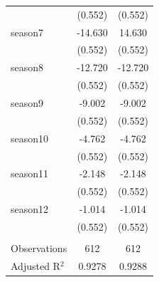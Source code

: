 \documentclass[12pt]{article}
\begin{document}
{\begin{table}[H]
{\begin{tabular}{@{\extracolsep{5pt}}lcc}
  & (0.552) & (0.552) \\ 
season7 & -14.630 & 14.630 \\ 
  & (0.552) & (0.552) \\ 
season8 & -12.720 & -12.720 \\ 
  & (0.552) & (0.552) \\ 
season9 & -9.002 & -9.002 \\ 
  & (0.552) & (0.552) \\ 
season10 & -4.762 & -4.762 \\ 
  & (0.552) & (0.552) \\ 
season11 & -2.148 & -2.148 \\ 
  & (0.552) & (0.552) \\ 
season12 & -1.014 & -1.014 \\ 
  & (0.552) & (0.552) \\ 
\hline \\[-1.8ex] 
Observations & 612 & 612 \\ 
Adjusted R$^{2}$ & 0.9278 & 0.9288 \\ 
\hline 
\hline
\end{tabular} 
}
\end{table} 

}
\end{document}

